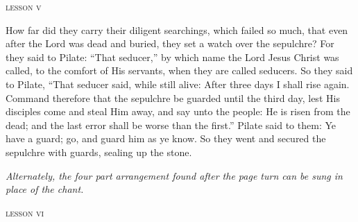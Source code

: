 \bigskip
\pagebreak
{
\begin{center}{\textsc{lesson v}}\end{center}

\begin{parcolumns}[rulebetween]{2}
{How far did they carry their diligent searchings, which failed so much, that even after the Lord was dead and buried, they set a watch over the sepulchre?
For they said to Pilate: ``That seducer,'' by which name the Lord Jesus Christ was called, to the comfort of His servants, when they are called seducers. So they said to Pilate, ``That seducer said, while still alive: After three days I shall rise again.
Command therefore that the sepulchre be guarded until the third day, lest His disciples come and steal Him away, and say unto the people: He is risen from the dead; and the last error shall be worse than the first.''
Pilate said to them: Ye have a guard; go, and guard him as ye know. So they went and secured the sepulchre with guards, sealing up the stone.}
\end{parcolumns}
}

\bigskip\bigskip


{
}

\emph{Alternately, the four part arrangement found after the page turn can be sung in place of the chant.}

\begin{center}{\textsc{lesson vi}}\end{center}

